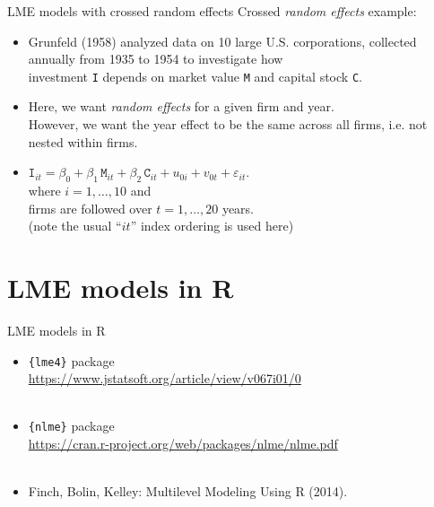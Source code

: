 \documentclass{beamer}
\begin{document}
\begin{frame}{LME models with crossed random effects}
Crossed \textit{random effects} example:\\
\medskip
\begin{itemize}
\item Grunfeld (1958) analyzed data on 10 large U.S. corporations,
collected annually from 1935 to 1954 to investigate how \\investment \texttt{I} depends on market value \texttt{M} and capital stock \texttt{C}.\\
\medskip
\item Here, we want \textit{random effects} for a given firm and year.\\
\smallskip
However, we want the year effect to be the same across all firms, i.e. not nested within firms.
\bigskip
\item $\texttt{I}_{it} = \beta_0 + \beta_1 \, \texttt{M}_{it} 
+ \beta_2 \, \texttt{C}_{it} + u_{0i} + v_{0t} + \varepsilon_{it}.$\\
\medskip
where $i=1, \dots, 10$ and \\firms are followed over $t=1,\dots,20$ years.
\\(note the usual ``$it$'' index ordering is used here)
\end{itemize}
\end{frame}
\section{LME models in R}
\begin{frame}{LME models in R}
\begin{itemize}
    \item \texttt{\{lme4\}} package \\ \smallskip
    \url{https://www.jstatsoft.org/article/view/v067i01/0}\\~\\
    \bigskip 
    \item \texttt{\{nlme\}} package \\ \smallskip
    \url{https://cran.r-project.org/web/packages/nlme/nlme.pdf}\\~\\
    \bigskip
    \item Finch, Bolin, Kelley: Multilevel Modeling Using R (2014).
\end{itemize}
\end{frame}
\end{document}
